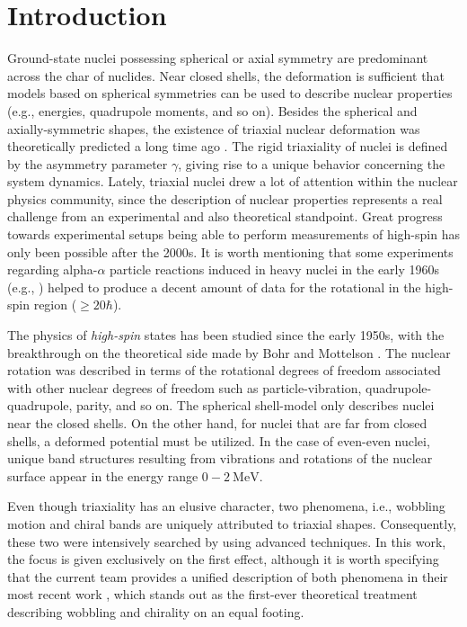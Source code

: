 \chapter{Introduction}

Ground-state nuclei possessing spherical or axial symmetry are predominant across the char of nuclides. Near closed shells, the deformation is sufficient that models based on spherical symmetries can be used to describe nuclear properties (e.g., energies, quadrupole moments, and so on). Besides the spherical and axially-symmetric shapes, the existence of triaxial nuclear deformation was theoretically predicted a long time ago \cite{bohr1998nuclear}. The rigid triaxiality of nuclei is defined by the asymmetry parameter $\gamma$, giving rise to a unique behavior concerning the system dynamics. Lately, triaxial nuclei drew a lot of attention within the nuclear physics community, since the description of nuclear properties represents a real challenge from an experimental and also theoretical standpoint. Great progress towards experimental setups being able to perform measurements of high-spin has only been possible after the 2000s. It is worth mentioning that some experiments regarding alpha-$\alpha$ particle reactions induced in heavy nuclei in the early 1960s (e.g., \cite{morinaga1963gamma}) helped to produce a decent amount of data for the rotational in the high-spin region ($\geq 20 \hbar$).

The physics of \emph{high-spin} states has been studied since the early 1950s, with the breakthrough on the theoretical side made by Bohr and Mottelson \cite{bohr1998nuclear}. The nuclear rotation was described in terms of the rotational degrees of freedom associated with other nuclear degrees of freedom such as particle-vibration, quadrupole-quadrupole, parity, and so on. The spherical shell-model only describes nuclei near the closed shells. On the other hand, for nuclei that are far from closed shells, a deformed potential must be utilized. In the case of even-even nuclei, unique band structures resulting from vibrations and rotations of the nuclear surface appear in the energy range $0-2\ \text{MeV}$.

Even though triaxiality has an elusive character, two phenomena, i.e., wobbling motion and chiral bands are uniquely attributed to triaxial shapes. Consequently, these two were intensively searched by using advanced techniques. In this work, the focus is given exclusively on the first effect, although it is worth specifying that the current team provides a unified description of both phenomena in their most recent work \cite{raduta2022simultaneous}, which stands out as the first-ever theoretical treatment describing wobbling and chirality on an equal footing.

